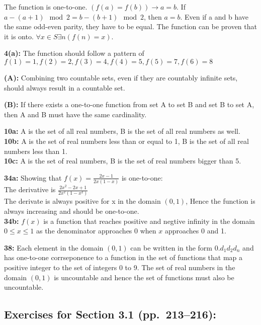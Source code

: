 \documentclass[12pt]{article}  %
\newcommand{\IMPLIES}{\rightarrow}
\begin{document}
The function is one-to-one. $(f(a) = f(b)) \IMPLIES a = b$. If $a - (a + 1) \mod{2} = b - (b + 1) \mod{2}$,
then $a = b$. Even if a and b have the same odd-even parity, they have to be equal.
The function can be proven that it is onto. $\forall x \in S \exists n(f(n) = x)$. 


\noindent
{\bf 4(a):}
The function should follow a pattern of $f(1) = 1, f(2) = 2, f(3) = 4, f(4) = 5, 
f(5) = 7, f(6) = 8$

\noindent
{\bf (A):}
Combining two countable sets, even if they are countably infinite sets, should always 
result in a countable set. 

\noindent
{\bf (B):}
If there exists a one-to-one function from set A to set B and set B to 
set A, then A and B must have the same cardinality. 

\noindent
{\bf 10a:}
A is the set of all real numbers, B is the set of all real numbers as well.
\\
{\bf 10b:}
A is the set of real numbers less than or equal to 1, B is the set of all real numbers less than 1.
\\
{\bf 10c:}
A is the set of real numbers, B is the set of real numbers bigger than 5.

\noindent
{\bf 34a:}
Showing that $f(x) = \frac{2x-1}{2x(1-x)}$ is one-to-one:
\\
The derivative is $\frac{2x^2-2x+1}{2x^2(1-x^2)}$
\\    
The derivate is always positive for x in the domain $(0, 1)$, Hence
the function is always increasing and should be one-to-one.
\\
{\bf 34b:}
$f(x)$ is a function that reaches positive and negtive infinity in the 
domain $0 \leq x \leq 1$ as the denominator approaches 0 when $x$ approaches
0 and 1.

\noindent
{\bf 38:}
Each element in the domain $(0, 1)$ can be written in 
the form $0.d_{1}d_{2}d_{n}$ and has one-to-one corrseponence 
to a function in the set of functions that map a positive integer
to the set of integers 0 to 9. The set of real numbers
in the domain $(0, 1)$ is uncountable and hence the set of functions must
also be uncountable.


\subsection*{Exercises for Section 3.1 (pp.\ 213--216):}     
\end{document}
